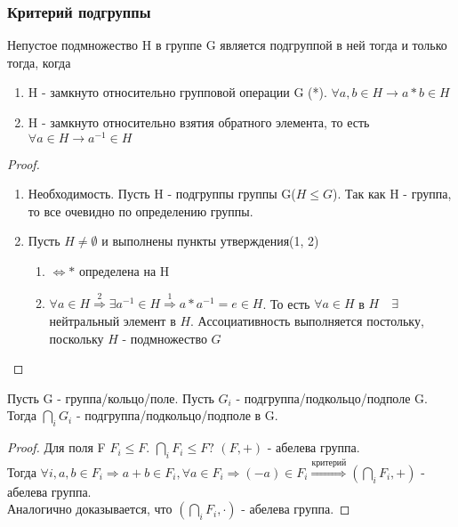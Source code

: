 \subsubsection{Критерий подгруппы}
\begin{proposition}
	Непустое подмножество H в группе G является подгруппой в ней тогда и только тогда, когда
	\begin{enumerate}
		\item H - замкнуто относительно групповой операции G (*). \(\forall a,b\in H\longrightarrow a*b\in H\)
		\item H - замкнуто относительно взятия обратного элемента, то есть \(\forall a\in H \longrightarrow a^{-1}\in H\)
	\end{enumerate} 
\end{proposition}
\begin{proof}
	\begin{enumerate}
		\item Необходимость. Пусть H - подгруппы группы G(\(H\le G\)). Так как H - группа, то все очевидно по определению группы.
		\item Пусть \(H\ne\emptyset\) и выполнены пункты утверждения(1, 2)
		\begin{enumerate}
			\item\(\Longleftrightarrow *\) определена на H
			\item \(\forall a\in H \overset{2}{\Longrightarrow} \exists a^{-1}\in H \overset{1}{\Longrightarrow} a*a^{-1} = e\in H\). 
			То есть \(\forall a\in H\) в \(H\quad \exists\) нейтральный элемент в $H$. 
			Ассоциативность выполняется постольку, поскольку $H$ - подмножество $G$
		\end{enumerate}
	\end{enumerate}
\end{proof}
\begin{proposition}
	Пусть G - группа/кольцо/поле. Пусть \(G_i\) - подгруппа/подкольцо/подполе G. Тогда \(\bigcap_{i} G_i\) - подгруппа/подкольцо/подполе в G.
\end{proposition}
\begin{proof}
	Для поля F \(F_i\le F\). \(\bigcap_{i} F_i\le F?\) \((F, +)\) - абелева группа. \\ 
	Тогда \(\forall i, a, b\in F_i\Longrightarrow a+b\in F_i, \forall a\in F_i\Longrightarrow (-a)\in F_i \overset{\text{критерий}}{\Longrightarrow} (\bigcap_{i} F_i, +)\) - абелева группа.\\
	Аналогично доказывается, что \((\bigcap_{i} F_i, \cdot)\) - абелева группа.
\end{proof}

